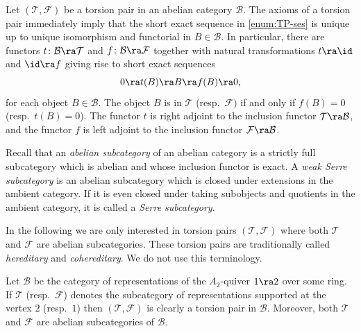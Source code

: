 \begin{remark}
  \label{rem:adjoints-f-and-t}
  Let $(\mathcal{T}, \mathcal{F})$
  be a torsion pair in an abelian category $\mathcal{B}$. 
  The axioms of a torsion pair immediately imply that 
  the short exact sequence in \ref{enum:TP-ses} is unique up to
  unique isomorphism and functorial in $B \in \mathcal{B}$.
  In particular, there are
  functors $t \colon \mathcal{B} \ra \mathcal{T}$ and $f \colon
  \mathcal{B} \ra \mathcal{F}$ together with 
  natural
  transformations
  $t \ra \id$ and $\id \ra f$ giving rise to short exact
  sequences 
  \begin{equation*}
    0 \ra t(B) \ra B \ra f(B) \ra 0,
  \end{equation*}
  for each object $B \in \mathcal{B}$. The object $B$ is in
  $\mathcal{T}$ (resp.\ $\mathcal{F})$ if and only if $f(B)=0$
  (resp.\ $t(B)=0$). 
  The functor $t$ is right adjoint to the inclusion functor
  $\mathcal{T} \ra \mathcal{B}$, and the functor $f$ is left
  adjoint to the inclusion functor 
  $\mathcal{F} \ra \mathcal{B}$.
\end{remark}

Recall that an \emph{abelian subcategory} of an abelian category
is a strictly full subcategory which is abelian and whose
inclusion functor is exact. 
A \emph{weak Serre subcategory}
is an abelian subcategory which is closed under
extensions in the ambient category.
If it is even closed under taking subobjects
and quotients in the ambient category, it is called a \emph{Serre
  subcategory}.  

\begin{remark}
  In the following we are only interested in torsion pairs 
  $(\mathcal{T}, \mathcal{F})$ where both
  $\mathcal{T}$ and $\mathcal{F}$ are abelian subcategories. 
  These torsion pairs are traditionally called
  \emph{hereditary} and \emph{cohereditary}. We do not use this
  terminology. 
\end{remark}

\begin{example}
  \label{e:A2-reps}
  Let $\mathcal{B}$ be the category of
  representations of the $A_2$-quiver $1 \ra 2$ over
  some ring. If $\mathcal{T}$ (resp.\ $\mathcal{F}$) denotes the
  subcategory of
  representations supported at the vertex $2$ (resp.\ $1$)
  then $(\mathcal{T}, \mathcal{F})$ is clearly a torsion pair in
  $\mathcal{B}$. Moreover, both $\mathcal{T}$ and
  $\mathcal{F}$ are abelian subcategories of $\mathcal{B}$.
\end{example}

